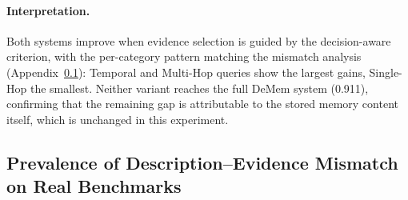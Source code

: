 \documentclass{article}
\theoremstyle{plain}
\theoremstyle{definition}
\theoremstyle{remark}
\begin{document}
\begin{table}[h]
\centering
\caption{Drop-in experiment on LoCoMo (gpt-4o-mini). Only the evidence
selection criterion is replaced; all other components are identical.}
\label{tab:dropin}
\small
{}
\end{table}

\paragraph{Interpretation.}
Both systems improve when evidence selection is guided by the
decision-aware criterion, with the per-category pattern matching the
mismatch analysis (Appendix~\ref{app:mismatch-prevalence}): Temporal and Multi-Hop
queries show the largest gains, Single-Hop the smallest.
Neither variant reaches the full DeMem system (0.911),
confirming that the remaining gap is attributable to the stored memory
content itself, which is unchanged in this experiment.

\subsection{Prevalence of Description--Evidence Mismatch on Real Benchmarks}
\label{app:mismatch-prevalence}
\end{document}
